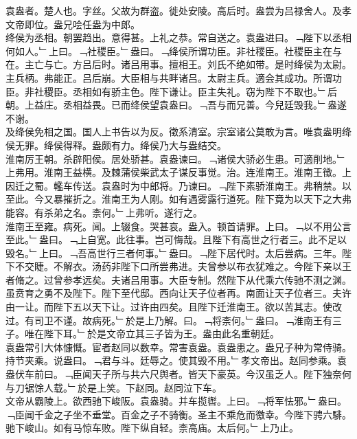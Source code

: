\documentclass{zhvt-classic}
\begin{document}

\hspace*{2em}袁盎者。楚人也。字丝。父故为群盗。徙处安陵。高后时。盎尝为吕禄舍人。及孝文帝即位。盎兄哙任盎为中郎。\\
\hspace*{2em}绛侯为丞相。朝罢趋出。意得甚。上礼之恭。常自送之。袁盎进曰。﹁陛下以丞相何如人。﹂上曰。﹁社稷臣。﹂盎曰。﹁绛侯所谓功臣。非社稷臣。社稷臣主在与在。主亡与亡。方吕后时。诸吕用事。擅相王。刘氏不绝如带。是时绛侯为太尉。主兵柄。弗能正。吕后崩。大臣相与共畔诸吕。太尉主兵。適会其成功。所谓功臣。非社稷臣。丞相如有骄主色。陛下谦让。臣主失礼。窃为陛下不取也。﹂后朝。上益庄。丞相益畏。已而绛侯望袁盎曰。﹁吾与而兄善。今兒廷毁我。﹂盎遂不谢。\\
\hspace*{2em}及绛侯免相之国。国人上书告以为反。徵系清室。宗室诸公莫敢为言。唯袁盎明绛侯无罪。绛侯得释。盎颇有力。绛侯乃大与盎结交。\\
\hspace*{2em}淮南厉王朝。杀辟阳侯。居处骄甚。袁盎谏曰。﹁诸侯大骄必生患。可適削地。﹂上弗用。淮南王益横。及棘蒲侯柴武太子谋反事觉。治。连淮南王。淮南王徵。上因迁之蜀。轞车传送。袁盎时为中郎将。乃谏曰。﹁陛下素骄淮南王。弗稍禁。以至此。今又暴摧折之。淮南王为人刚。如有遇雾露行道死。陛下竟为以天下之大弗能容。有杀弟之名。柰何。﹂上弗听。遂行之。\\
\hspace*{2em}淮南王至雍。病死。闻。上辍食。哭甚哀。盎入。顿首请罪。上曰。﹁以不用公言至此。﹂盎曰。﹁上自宽。此往事。岂可悔哉。且陛下有高世之行者三。此不足以毁名。﹂上曰。﹁吾高世行三者何事。﹂盎曰。﹁陛下居代时。太后尝病。三年。陛下不交睫。不解衣。汤药非陛下口所尝弗进。夫曾参以布衣犹难之。今陛下亲以王者脩之。过曾参孝远矣。夫诸吕用事。大臣专制。然陛下从代乘六传驰不测之渊。虽贲育之勇不及陛下。陛下至代邸。西向让天子位者再。南面让天子位者三。夫许由一让。而陛下五以天下让。过许由四矣。且陛下迁淮南王。欲以苦其志。使改过。有司卫不谨。故病死。﹂於是上乃解。曰。﹁将柰何。﹂盎曰。﹁淮南王有三子。唯在陛下耳。﹂於是文帝立其三子皆为王。盎由此名重朝廷。\\
\hspace*{2em}袁盎常引大体慷慨。宦者赵同以数幸。常害袁盎。袁盎患之。盎兄子种为常侍骑。持节夹乘。说盎曰。﹁君与斗。廷辱之。使其毁不用。﹂孝文帝出。赵同参乘。袁盎伏车前曰。﹁臣闻天子所与共六尺舆者。皆天下豪英。今汉虽乏人。陛下独奈何与刀锯馀人载。﹂於是上笑。下赵同。赵同泣下车。\\
\hspace*{2em}文帝从霸陵上。欲西驰下峻阪。袁盎骑。并车揽辔。上曰。﹁将军怯邪。﹂盎曰。﹁臣闻千金之子坐不垂堂。百金之子不骑衡。圣主不乘危而徼幸。今陛下骋六騑。驰下峻山。如有马惊车败。陛下纵自轻。柰高庙。太后何。﹂上乃止。\\
\end{document}
